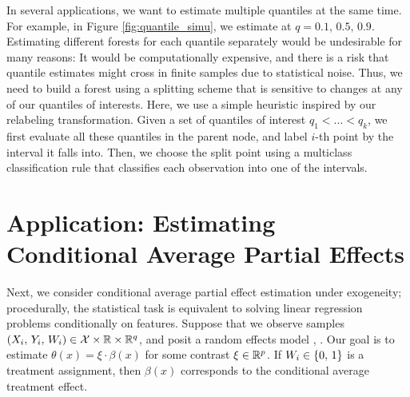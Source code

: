 \documentclass[aos]{imsart}
\theoremstyle{plain}
\theoremstyle{definition}
\theoremstyle{remark}
\begin{document}
\begin{CJK}{UTF8}{gbsn}
{In several applications, we want to estimate multiple quantiles
at the same time. For example, in Figure \ref{fig:quantile_simu}, we estimate at $q = 0.1, \, 0.5, \, 0.9$.
Estimating different forests for each quantile separately would be undesirable
for many reasons: It would be computationally expensive, and there is a risk that quantile
estimates might cross in finite samples due to statistical noise. Thus, we need to build a forest using
a splitting scheme that is sensitive to changes at any of our quantiles of interests.
Here, we use a simple heuristic inspired by our relabeling transformation.
Given a set of quantiles of interest $q_1 < ... < q_k$, we first evaluate all these quantiles
  in the parent node, and label $i$-th point by the
interval \smash{$[\htheta_{q_{j - 1}, P(X_i)}, \, \htheta_{q_{j}, P(X_i)})$} it falls into. Then, we choose the
split point using a multiclass classification rule that classifies each observation into one of the intervals.


\section{Application: Estimating Conditional Average Partial Effects}
\label{sec:cape}

Next, we consider conditional average partial effect estimation under
exogeneity; procedurally, the statistical task is equivalent to solving linear regression problems
conditionally on features. Suppose that we observe samples
$(X_i, \, Y_i, \, W_i) \in \mathcal{X} \times \mathbb{R} \times \mathbb{R}^q$, and posit a random effects model
, .
Our goal is to estimate $\theta(x) = \xi \cdot \beta(x)$ for some contrast $\xi \in \mathbb{R}^p$.
If $W_i \in \left\{0, \, 1\right\}$ is a treatment assignment, then $\beta(x)$ corresponds to the
conditional average treatment effect.

}
\end{CJK}
\end{document}
